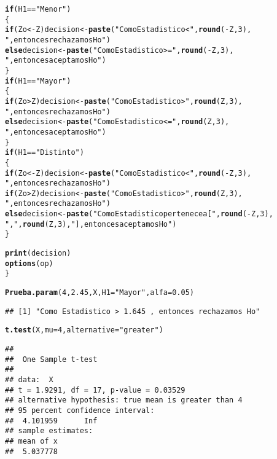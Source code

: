\documentclass{article}\usepackage[]{graphicx}\usepackage[]{color}
\makeatletter
\newcommand{\hlnum}[1]{\textcolor[rgb]{0.686,0.059,0.569}{#1}}%
\newcommand{\hlstr}[1]{\textcolor[rgb]{0.192,0.494,0.8}{#1}}%
\newcommand{\hlopt}[1]{\textcolor[rgb]{0,0,0}{#1}}%
\newcommand{\hlstd}[1]{\textcolor[rgb]{0.345,0.345,0.345}{#1}}%
\newcommand{\hlkwa}[1]{\textcolor[rgb]{0.161,0.373,0.58}{\textbf{#1}}}%
\newcommand{\hlkwb}[1]{\textcolor[rgb]{0.69,0.353,0.396}{#1}}%
\newcommand{\hlkwc}[1]{\textcolor[rgb]{0.333,0.667,0.333}{#1}}%
\newcommand{\hlkwd}[1]{\textcolor[rgb]{0.737,0.353,0.396}{\textbf{#1}}}%
\newenvironment{kframe}{%
 \def\at@end@of@kframe{}%
 \ifinner\ifhmode%
  \def\at@end@of@kframe{\end{minipage}}%
  \begin{minipage}{\columnwidth}%
 \fi\fi%
 \def\FrameCommand##1{\hskip\@totalleftmargin \hskip-\fboxsep
 \colorbox{shadecolor}{##1}\hskip-\fboxsep
     \hskip-\linewidth \hskip-\@totalleftmargin \hskip\columnwidth}%
 \MakeFramed {\advance\hsize-\width
   \@totalleftmargin\z@ \linewidth\hsize
   \@setminipage}}%
 {\par\unskip\endMakeFramed%
 \at@end@of@kframe}
\newenvironment{knitrout}{}{} %
\makeatother
\begin{document}
\begin{knitrout}
\begin{kframe}
\begin{alltt}
  \hlkwa{if} \hlstd{(H1} \hlopt{==} \hlstr{"Menor"}\hlstd{)}
  \hlstd{\{}
    \hlkwa{if} \hlstd{(Zo} \hlopt{< -}\hlstd{Z) decision} \hlkwb{<-} \hlkwd{paste}\hlstd{(}\hlstr{"Como Estadistico <"}\hlstd{,} \hlkwd{round}\hlstd{(}\hlopt{-}\hlstd{Z,}\hlnum{3}\hlstd{),}
                                   \hlstr{", entonces rechazamos Ho"}\hlstd{)}
    \hlkwa{else} \hlstd{decision} \hlkwb{<-} \hlkwd{paste}\hlstd{(}\hlstr{"Como Estadistico>="}\hlstd{,} \hlkwd{round}\hlstd{(}\hlopt{-}\hlstd{Z,}\hlnum{3}\hlstd{),}
                           \hlstr{", entonces aceptamos Ho"}\hlstd{)}
  \hlstd{\}}
  \hlkwa{if} \hlstd{(H1} \hlopt{==} \hlstr{"Mayor"}\hlstd{)}
  \hlstd{\{}
    \hlkwa{if} \hlstd{(Zo} \hlopt{>} \hlstd{Z) decision} \hlkwb{<-} \hlkwd{paste}\hlstd{(}\hlstr{"Como Estadistico >"}\hlstd{,} \hlkwd{round}\hlstd{(Z,}\hlnum{3}\hlstd{),}
                                  \hlstr{", entonces rechazamos Ho"}\hlstd{)}
    \hlkwa{else} \hlstd{decision} \hlkwb{<-} \hlkwd{paste}\hlstd{(}\hlstr{"Como Estadistico <="}\hlstd{,} \hlkwd{round}\hlstd{(Z,}\hlnum{3}\hlstd{),}
                           \hlstr{", entonces aceptamos Ho"}\hlstd{)}
  \hlstd{\}}
  \hlkwa{if} \hlstd{(H1} \hlopt{==} \hlstr{"Distinto"}\hlstd{)}
  \hlstd{\{}
    \hlkwa{if} \hlstd{(Zo} \hlopt{< -}\hlstd{Z) decision} \hlkwb{<-} \hlkwd{paste}\hlstd{(}\hlstr{"Como Estadistico <"}\hlstd{,} \hlkwd{round}\hlstd{(}\hlopt{-}\hlstd{Z,}\hlnum{3}\hlstd{),}
                                   \hlstr{", entonces rechazamos Ho"}\hlstd{)}
    \hlkwa{if} \hlstd{(Zo} \hlopt{>} \hlstd{Z) decision} \hlkwb{<-} \hlkwd{paste}\hlstd{(}\hlstr{"Como Estadistico >"}\hlstd{,} \hlkwd{round}\hlstd{(Z,}\hlnum{3}\hlstd{),}
                                  \hlstr{", entonces rechazamos Ho"}\hlstd{)}
    \hlkwa{else} \hlstd{decision} \hlkwb{<-} \hlkwd{paste}\hlstd{(}\hlstr{"Como Estadistico pertenece a ["}\hlstd{,} \hlkwd{round}\hlstd{(}\hlopt{-}\hlstd{Z,}\hlnum{3}\hlstd{),}
\hlstr{","}\hlstd{,} \hlkwd{round}\hlstd{(Z,}\hlnum{3}\hlstd{),} \hlstr{"], entonces aceptamos Ho"}\hlstd{)}
  \hlstd{\}}

  \hlkwd{print}\hlstd{(decision)}
  \hlkwd{options}\hlstd{(op)}
  \hlstd{\}}

\hlkwd{Prueba.param}\hlstd{(}\hlnum{4}\hlstd{,} \hlnum{2.45}\hlstd{, X,} \hlkwc{H1}\hlstd{=}\hlstr{"Mayor"}\hlstd{,} \hlkwc{alfa}\hlstd{=}\hlnum{0.05}\hlstd{)}
\end{alltt}
\begin{verbatim}
## [1] "Como Estadistico > 1.645 , entonces rechazamos Ho"
\end{verbatim}
\begin{alltt}
\hlkwd{t.test}\hlstd{(X,}\hlkwc{mu}\hlstd{=}\hlnum{4}\hlstd{,}\hlkwc{alternative}\hlstd{=}\hlstr{"greater"}\hlstd{)}
\end{alltt}
\begin{verbatim}
## 
## 	One Sample t-test
## 
## data:  X
## t = 1.9291, df = 17, p-value = 0.03529
## alternative hypothesis: true mean is greater than 4
## 95 percent confidence interval:
##  4.101959      Inf
## sample estimates:
## mean of x 
##  5.037778
\end{verbatim}
\end{kframe}
\end{knitrout}
\end{document}
